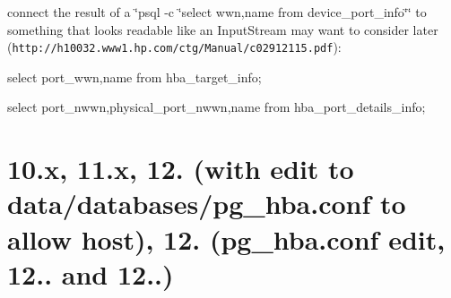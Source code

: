 connect the result of a \char`\"{}psql -\/c \char`\"{}select wwn,name from device\+\_\+port\+\_\+info\char`\"{}\char`\"{} to something that looks readable like an Input\+Stream may want to consider later ({\tt http\+://h10032.\+www1.\+hp.\+com/ctg/\+Manual/c02912115.\+pdf})\+:


\begin{DoxyItemize}
\item select port\+\_\+wwn,name from hba\+\_\+target\+\_\+info;
\item select port\+\_\+nwwn,physical\+\_\+port\+\_\+nwwn,name from hba\+\_\+port\+\_\+details\+\_\+info;
\end{DoxyItemize}\section{10.\+x, 11.\+x, 12. (with edit to data/databases/pg\+\_\+hba.\+conf to allow host), 12. (pg\+\_\+hba.\+conf edit, 12.. and 12..)}\label{Compatibility_BNA}
